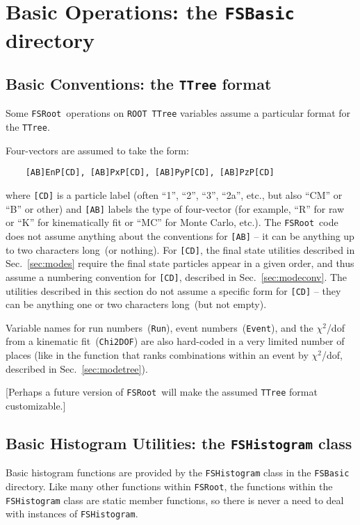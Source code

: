 \documentclass[11pt]{article}
\newcommand{\FSR}{{\tt FSRoot}}
\newcommand{\ROOT}{{\tt ROOT}}
\begin{document}
\section{Basic Operations:  the {\tt FSBasic} directory}

\subsection{Basic Conventions: the {\tt TTree} format}
\label{sec:conventions}

Some \FSR\ operations on \ROOT\ {\tt TTree} variables assume a particular format for the {\tt TTree}.  

Four-vectors are assumed to take the form:
\begin{verbatim}
    [AB]EnP[CD], [AB]PxP[CD], [AB]PyP[CD], [AB]PzP[CD]
\end{verbatim}
where {\tt [CD]} is a particle label (often ``1'', ``2'', ``3'', ``2a'', etc., but also ``CM'' or ``B'' or other) and {\tt [AB]} labels the type of four-vector (for example, ``R'' for raw or ``K'' for kinematically fit or ``MC'' for Monte Carlo, etc.).  The \FSR\ code does not assume anything about the conventions for {\tt [AB]} -- it can be anything up to two characters long~(or nothing).  For {\tt [CD]}, the final state utilities described in Sec.~\ref{sec:modes} require the final state particles appear in a given order, and thus assume a numbering convention for {\tt [CD]}, described in Sec.~\ref{sec:modeconv}.  The utilities described in this section do not assume a specific form for {\tt [CD]} -- they can be anything one or two characters long~(but not empty).

Variable names for run numbers~({\tt Run}), event numbers~({\tt Event}), and the $\chi^2$/dof from a kinematic fit~({\tt Chi2DOF}) are also hard-coded in a very limited number of places (like in the function that ranks combinations within an event by $\chi^2$/dof, described in Sec.~\ref{sec:modetree}).

[Perhaps a future version of \FSR\ will make the assumed {\tt TTree} format customizable.]


\subsection{Basic Histogram Utilities: the {\tt FSHistogram} class}
\label{sec:hist}

Basic histogram functions are provided by the {\tt FSHistogram} class in the {\tt FSBasic} directory.  Like many other functions within \FSR, the functions within the {\tt FSHistogram} class are static member functions, so there is never a need to deal with instances of {\tt FSHistogram}.
\end{document}
